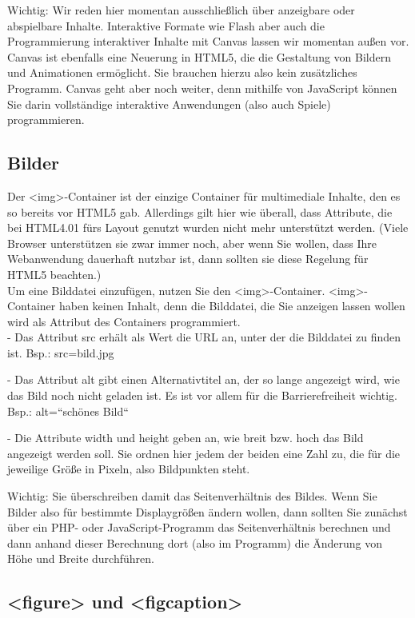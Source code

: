 Wichtig: Wir reden hier momentan ausschließlich über anzeigbare oder abspielbare Inhalte. Interaktive Formate wie Flash aber auch die Programmierung interaktiver Inhalte mit Canvas lassen wir momentan außen vor. Canvas ist ebenfalls eine Neuerung in HTML5, die die Gestaltung von Bildern und Animationen ermöglicht. Sie brauchen hierzu also kein zusätzliches Programm. Canvas geht aber noch weiter, denn mithilfe von JavaScript können Sie darin vollständige interaktive Anwendungen (also auch Spiele) programmieren.

\subsection{Bilder}

Der <img>-Container ist der einzige Container für multimediale Inhalte, den es so bereits vor HTML5 gab. Allerdings gilt hier wie überall, dass Attribute, die bei HTML4.01 fürs Layout genutzt wurden nicht mehr unterstützt werden. (Viele Browser unterstützen sie zwar immer noch, aber wenn Sie wollen, dass Ihre Webanwendung dauerhaft nutzbar ist, dann sollten sie diese Regelung für HTML5 beachten.)\\

Um eine Bilddatei einzufügen, nutzen Sie den <img>-Container. <img>-Container haben keinen Inhalt, denn die Bilddatei, die Sie anzeigen lassen wollen wird als Attribut des Containers programmiert.\\

-	Das Attribut src erhält als Wert die URL an, unter der die Bilddatei zu finden ist.
Bsp.: src=bild.jpg

-	Das Attribut alt gibt einen Alternativtitel an, der so lange angezeigt wird, wie das Bild noch nicht geladen ist. Es ist vor allem für die Barrierefreiheit wichtig.
Bsp.: alt=“schönes Bild“

-	Die Attribute width und height geben an, wie breit bzw. hoch das Bild angezeigt werden soll. Sie ordnen hier jedem der beiden eine Zahl zu, die für die jeweilige Größe in Pixeln, also Bildpunkten steht. 

Wichtig: Sie überschreiben damit das Seitenverhältnis des Bildes. Wenn Sie Bilder also für bestimmte Displaygrößen ändern wollen, dann sollten Sie zunächst über ein PHP- oder JavaScript-Programm das Seitenverhältnis berechnen und dann anhand dieser Berechnung dort (also im Programm) die Änderung von Höhe und Breite durchführen.

\subsection{<figure> und <figcaption>}

